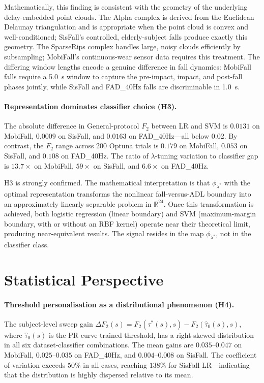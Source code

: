 \documentclass[onluarkali,ingilizce,yukseklisans,karton,LisansustuEgitim]{itutez}
\providecommand{\R}{\mathbb{R}}
\providecommand{\1}{\mathbf{1}}
\begin{document}
Mathematically, this finding is consistent with the geometry of the underlying
delay-embedded point clouds.  The Alpha complex is derived from the Euclidean
Delaunay triangulation and is appropriate when the point cloud is convex and
well-conditioned; SisFall's controlled, elderly-subject falls produce exactly this
geometry.  The SparseRips complex handles large, noisy clouds efficiently by
subsampling; MobiFall's continuous-wear sensor data requires this treatment.  The
differing window lengths encode a genuine difference in fall dynamics: MobiFall falls
require a 5.0~s window to capture the pre-impact, impact, and post-fall phases
jointly, while SisFall and FAD\_40Hz falls are discriminable in 1.0~s.

\paragraph{Representation dominates classifier choice (H3).}
The absolute difference in General-protocol $F_2$ between LR and SVM is $0.0131$
on MobiFall, $0.0009$ on SisFall, and $0.0163$ on FAD\_40Hz---all below $0.02$.
By contrast, the $F_2$ range across 200 Optuna trials is $0.179$ on MobiFall,
$0.053$ on SisFall, and $0.108$ on FAD\_40Hz.  The ratio of $\lambda$-tuning
variation to classifier gap is $13.7\times$ on MobiFall, $59\times$ on SisFall,
and $6.6\times$ on FAD\_40Hz.

H3 is strongly confirmed.  The mathematical interpretation is that $\phi_{\lambda^*}$
with the optimal representation transforms the nonlinear fall-versus-ADL boundary
into an approximately linearly separable problem in $\R^{24}$.  Once this
transformation is achieved, both logistic regression (linear boundary) and SVM
(maximum-margin boundary, with or without an RBF kernel) operate near their
theoretical limit, producing near-equivalent results.  The signal resides in the
map $\phi_{\lambda^*}$, not in the classifier class.

\section{Statistical Perspective}
\label{subsec:conclusion-stat}

\paragraph{Threshold personalisation as a distributional phenomenon (H4).}
The subject-level sweep gain $\Delta F_2(s) = F_2(\tau^*(s),s) - F_2(\hat\tau_0(s),s)$,
where $\hat\tau_0(s)$ is the PR-curve trained threshold, has a right-skewed
distribution in all six dataset-classifier combinations.  The mean gains are
$0.035$--$0.047$ on MobiFall, $0.025$--$0.035$ on FAD\_40Hz, and
$0.004$--$0.008$ on SisFall.  The coefficient of variation exceeds $50\%$ in all
cases, reaching $138\%$ for SisFall LR---indicating that the distribution is highly
dispersed relative to its mean.
\end{document}
